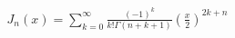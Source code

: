 \documentclass[preview]{standalone}
\begin{document}
\begin{align*}
J_n(x) = \sum_{k=0}^{\infty} \frac{(-1)^k}{k! \Gamma(n+k+1)} \left(\frac{x}{2}\right)^{2k+n}
\end{align*}
\end{document}
